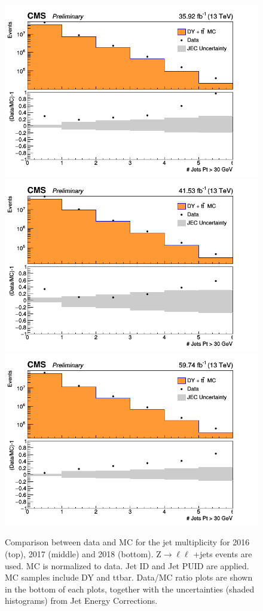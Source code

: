 \begin{figure}[!h]
\centering
\includegraphics[width=0.49\linewidth]{Figures/Jets/nCleanedJetsPt30_2016June24.png} \\
\includegraphics[width=0.49\linewidth]{Figures/Jets/nCleanedJetsPt30_2017June24.png} \\
\includegraphics[width=0.49\linewidth]{Figures/Jets/nCleanedJetsPt30_2018June24.png} \\

\caption{Comparison between data and MC for the jet multiplicity for 2016 (top), 2017 (middle) and 2018 (bottom). Z$\rightarrow \ell\ell$ +jets events are used. 
MC is normalized to data. Jet ID and Jet PUID are applied. MC samples include DY and ttbar. Data/MC ratio plots are shown in the bottom of each plots, together with the uncertainties (shaded histograms) from Jet Energy Corrections.
\label{fig:jetsN}}
\end{figure}


